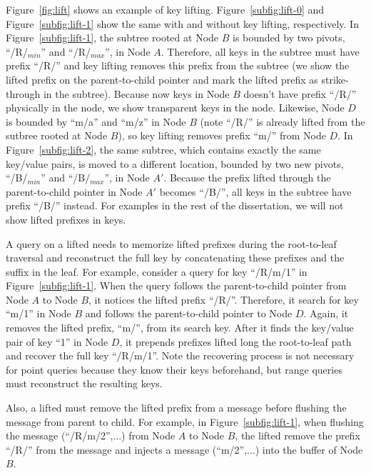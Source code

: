 Figure~\ref{fig:lift} shows an example of key lifting.
Figure~\ref{subfig:lift-0} and Figure~\ref{subfig:lift-1} show the same \bet
with and without key lifting, respectively.
In Figure~\ref{subfig:lift-1}, the subtree rooted at Node $B$ is
bounded by two pivots, ``/R/$_{min}$'' and ``/R/$_{max}$'', in Node $A$.
Therefore, all keys in the subtree must have prefix ``/R/'' and key lifting
removes this prefix from the subtree
(we show the lifted prefix on the parent-to-child pointer and mark the lifted
prefix as strike-through in the subtree).
Because now keys in Node $B$ doesn't have prefix ``/R/'' physically in the node,
we show transparent keys in the node.
Likewise, Node $D$ is bounded by ``m/a'' and ``m/z'' in Node $B$
(note ``/R/'' is already lifted from the sutbree rooted at Node $B$),
so key lifting removes prefix ``m/'' from Node $D$.
In Figure~\ref{subfig:lift-2}, the same subtree, which contains exactly the
same key/value pairs, is moved to a different location, bounded by two new
pivots, ``/B/$_{min}$'' and ``/B/$_{max}$'', in Node $A'$.
Because the prefix lifted through the parent-to-child pointer in Node $A'$
becomes ``/B/'', all keys in the subtree have prefix ``/B/'' instead.
For examples in the rest of the dissertation, we will not show lifted prefixes
in keys.

A query on a lifted \bet needs to memorize lifted prefixes during the
root-to-leaf traversal and reconstruct the full key by concatenating these
prefixes and the suffix in the leaf.
For example, consider a query for key ``/R/m/1'' in Figure~\ref{subfig:lift-1}.
When the query follows the parent-to-child pointer from Node $A$ to Node $B$,
it notices the lifted prefix ``/R/''.
Therefore, it search for key ``m/1'' in Node $B$ and follows the parent-to-child
pointer to Node $D$.
Again, it removes the lifted prefix, ``m/'', from its search key.
After it finds the key/value pair of key ``1'' in Node $D$, it prepends prefixes
lifted long the root-to-leaf path and recover the full key ``/R/m/1''.
Note the recovering process is not necessary for point queries because they know
their keys beforehand, but range queries must reconstruct the resulting keys.

Also, a lifted \bet must remove the lifted prefix from a message before flushing
the message from parent to child.
For example, in Figure~\ref{subfig:lift-1}, when flushing the message
\putm(``/R/m/2'',...) from Node $A$ to Node $B$, the lifted \bet remove the
prefix ``/R/'' from the message and injects a message \putm(``m/2'',...) into
the buffer of Node $B$.

